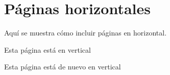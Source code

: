 


\chapter{Páginas horizontales}
Aquí se muestra cómo incluir páginas en horizontal.

Esta página está en vertical\\
\clearpage %







Esta página está de nuevo en vertical\\



